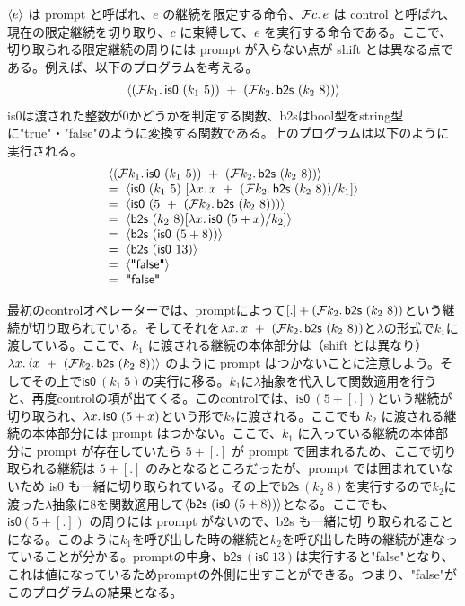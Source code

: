 $\langle{e}\rangle$ は prompt と呼ばれ、$e$ の継続を限定する命令、${\cal F}{c}.\,{e}$ は control と呼ばれ、現在の限定継続を切り取り、$c$ に束縛して、$e$ を実行する命令である。ここで、切り取られる限定継続の周りには prompt が入らない点が shift とは異なる点である。例えば、以下のプログラム\cite{FSCD2021}を考える。
\[
\begin{array}{c}
  \Prompt{(\Control{k_1}{\textsf{is0}\ (k_1\ 5)})\ +\ (\Control{k_2}{\textsf{b2s}\ (k_2\ 8)})}
\end{array}
\]
\textsf{is0}は渡された整数が0かどうかを判定する関数、\textsf{b2s}はbool型をstring型に\textsf{"true"}・\textsf{"false"}のように変換する関数である。上のプログラムは以下のように実行される。
\[
\begin{array}{l}
  \Prompt{(\Control{k_1}{\textsf{is0}\ (k_1\ 5)})\ +\ (\Control{k_2}{\textsf{b2s}\ (k_2\ 8)})}\\
  =\ \Prompt{\textsf{is0}\ (k_1\ 5)\ [\Lam{x}{x}\ +\ (\Control{k_2}{\textsf{b2s}\ (k_2\ 8)})/k_1]}\\
  =\ \Prompt{\textsf{is0}\ (5\ +\ (\Control{k_2}{\textsf{b2s}\ (k_2\ 8)}))}\\
  =\ \Prompt{\textsf{b2s}\ (k_2\ 8)[\Lam{x}{\textsf{is0}\ (5 + x)}/k_2]}\\
  =\ \Prompt{\textsf{b2s}\ (\textsf{is0}\ (5+8))}\\
  =\ \Prompt{\textsf{b2s}\ (\textsf{is0}\ 13)}\\
  =\ \Prompt{\textsf{"false"}}\\
  =\ \textsf{"false"}
\end{array}
\]

最初のcontrolオペレーターでは、promptによって$[.]+(\Control{k_2}{\textsf{b2s}\ (k_2\ 8)})$という継続が切り取られている。そしてそれを$\Lam{x}{x}\ +\ (\Control{k_2}{\textsf{b2s}\ (k_2\ 8)})$と$\lambda$の形式で$k_1$に渡している。ここで、$k_1$ に渡される継続の本体部分は（shift とは異なり）
  $\Lam{x}{\langle x}\ +\ (\Control{k_2}{\textsf{b2s}\ (k_2\ 8)})\rangle$ のように prompt はつかないことに注意しよう。そしてその上で$\textsf{is0}\ (k_1\ 5)$の実行に移る。$k_1$に$\lambda$抽象を代入して関数適用を行うと、再度controlの項が出てくる。このcontrolでは、$\textsf{is0}\ (5 + [.])$という継続が切り取られ、$\lambda{x}.\,{\textsf{is0}\ (5 + x)}$という形で$k_2$に渡される。ここでも $k_2$ に渡される継続の本体部分には prompt はつかない。ここで、$k_1$ に入っている継続の本体部分に prompt が存在していたら $5+[.]$ が prompt で囲まれるため、ここで切り取られる継続は $5+[.]$ のみとなるところだったが、prompt では囲まれていないため \textsf{is0} も一緒に切り取られている。その上で$\textsf{b2s}\ (k_2\ 8)$を実行するので$k_2$に渡った$\lambda$抽象に8を関数適用して$\Prompt{\textsf{b2s}\ (\textsf{is0}\ (5+8))}$となる。ここでも、$\textsf{is0} (5 + [.])$ の周りには prompt がないので、\textsf{b2s} も一緒に切
り取られることになる。このように$k_1$を呼び出した時の継続と$k_2$を呼び出した時の継続が連なっていることが分かる。promptの中身、$\textsf{b2s}\ (\textsf{is0}\ 13)$は実行すると\textsf{"false"}となり、これは値になっているためpromptの外側に出すことができる。つまり、\textsf{"false"}がこのプログラムの結果となる。

